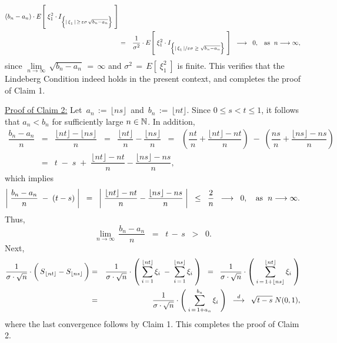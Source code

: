 \begin{enumerate}
\begin{eqnarray*}
		(b_{n}-a_{n})
		\cdot
		E\!\left[\;
		\xi_{1}^{2}
		\cdot
		I_{\left\{\vert\,\overset{{\color{white}.}}{\xi}_{1}\,\vert\,\geq\,\varepsilon\sigma\,\sqrt{b_{n}-a_{n}}\right\}}
		\;\right]
		\\	
		&=&
		\dfrac{1}{\sigma^{2}}
		\cdot
		E\!\left[\;
		\xi_{1}^{2}
		\cdot
		I_{\left\{\vert\,\overset{{\color{white}.}}{\xi}_{1}\,\vert/\varepsilon\sigma\;\geq\;\sqrt{b_{n}-a_{n}}\right\}}
		\;\right]
		\;\; \longrightarrow \;\; 0,
		\;\;\;\textnormal{as \;$n \longrightarrow \infty$},
		\end{eqnarray*}
		since $\underset{n\rightarrow\infty}{\lim}\,\sqrt{b_{n} - a_{n}} \,=\, \infty$
		\;and\; $\sigma^{2} \,=\, E\!\left[\;\xi_{1}^{2}\;\right]$ is finite.
		This verifies that the Lindeberg Condition indeed holds in the present context,
		and completes the proof of Claim 1.

		\vskip 0.5cm
		\noindent
		\underline{Proof of Claim 2:}\quad
		Let \,$a_{n} \,:=\, \lfloor ns \rfloor$\, and \,$b_{n} \,:=\, \lfloor nt \rfloor$.
		Since $0 \leq s < t \leq 1$, it follows that $a_{n} < b_{n}$ for sufficiently large $n \in \mathbb{N}$.
		In addition,
		\begin{eqnarray*}
		\dfrac{b_{n} - a_{n}}{n}
		&=& \dfrac{\lfloor nt \rfloor - \lfloor ns \rfloor}{n}
		\;\; = \;\; \dfrac{\lfloor nt \rfloor}{n} - \dfrac{\lfloor ns \rfloor}{n}
		\;\; = \;\; \left(\dfrac{nt}{n} + \dfrac{\lfloor nt \rfloor - nt}{n}\right)
			\;-\; \left(\dfrac{ns}{n} + \dfrac{\lfloor ns \rfloor - ns}{n}\right)
		\\
		&=& t \;-\; s \;+\;  \dfrac{\lfloor nt \rfloor - nt}{n} - \dfrac{\lfloor ns \rfloor - ns}{n},
		\end{eqnarray*}
		which implies
		\begin{equation*}
		\left\vert\; \dfrac{b_{n} - a_{n}}{n} \;-\; (t-s) \;\right\vert
		\;\;=\;\;
		\left\vert\; \dfrac{\lfloor nt \rfloor - nt}{n} - \dfrac{\lfloor ns \rfloor - ns}{n} \;\right\vert
		\;\; \leq \;\;
		\dfrac{2}{n}
		\;\; \longrightarrow \;\; 0,
		\quad
		\textnormal{as \;$n \longrightarrow \infty$}.
		\end{equation*}
		Thus,
		\begin{equation*}
		\lim_{n\rightarrow\infty}\,\dfrac{b_{n} - a_{n}}{n} \;\;=\;\; t \,-\, s \;\;>\;\; 0.
		\end{equation*}
		Next,
		\begin{eqnarray*}
		\dfrac{1}{\sigma\cdot\sqrt{n}}
		\cdot
		\left(\,\overset{{\color{white}1}}{S}_{\lfloor nt \rfloor} - S_{\lfloor ns \rfloor}\,\right)
		&=&
		\dfrac{1}{\sigma\cdot\sqrt{n}}
		\cdot
		\left(\;\sum_{i\,=\,1}^{\lfloor nt \rfloor}\xi_{i} \;-\; \sum_{i\,=\,1}^{\lfloor ns \rfloor}\xi_{i} \;\right)
		\;\;=\;\;
		\dfrac{1}{\sigma\cdot\sqrt{n}}
		\cdot
		\left(\;\sum_{i\,=\,1+\lfloor ns \rfloor}^{\lfloor nt \rfloor}\xi_{i}\;\right)
		\\
		&=&
		\dfrac{1}{\sigma\cdot\sqrt{n}}
		\cdot
		\left(\;\sum_{i\,=\,1+a_{n}}^{b_{n}}\xi_{i}\;\right)
		\;\; \overset{d}{\longrightarrow} \;\;
		\sqrt{t - s}\;N(0,1),
		\end{eqnarray*}
		where the last convergence follows by Claim 1.
		This completes the proof of Claim 2.


\end{enumerate}
